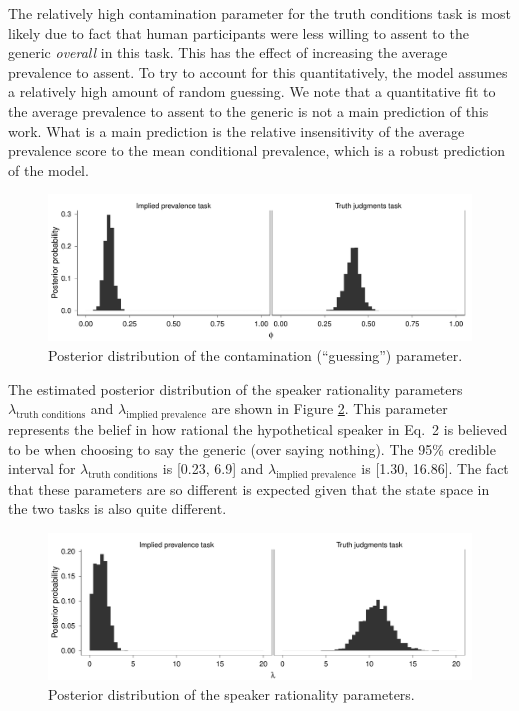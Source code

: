 \documentclass[10pt,letterpaper]{article}
\begin{document}
The relatively high contamination parameter for the truth conditions task is most likely due to fact that human participants were less willing to assent to the generic \emph{overall} in this task. 
This has the effect of increasing the average prevalence to assent. 
To try to account for this quantitatively, the model assumes a relatively high amount of random guessing. 
We note that a quantitative fit to the average prevalence to assent to the generic is not a main prediction of this work. 
What is a main prediction is the relative insensitivity of the average prevalence score to the mean conditional prevalence, which is a robust prediction of the model. 


\begin{figure}
\centering
    \includegraphics[width=0.8\columnwidth]{asymmetry-phi-3x50k.pdf}
    \caption{Posterior distribution of the contamination (``guessing'') parameter.}
  \label{fig:phi2}
\end{figure}

The estimated posterior distribution of the speaker rationality parameters $\lambda_{\text{truth conditions}}$ and $\lambda_{\text{implied prevalence}}$ are shown in Figure \ref{fig:rationality2}. 
This parameter represents the belief in how rational the hypothetical speaker in Eq.~2 is believed to be when choosing to say the generic (over saying nothing). 
The 95\% credible interval for $\lambda_{\text{truth conditions}}$ is [0.23, 6.9] and $\lambda_{\text{implied prevalence}}$ is [1.30, 16.86]. 
The fact that these parameters are so different is expected given that the state space in the two tasks is also quite different.


\begin{figure}
\centering
    \includegraphics[width=0.8\columnwidth]{asymmetry-speakeropts-3x50k.pdf}
    \caption{Posterior distribution of the speaker rationality parameters.}
  \label{fig:rationality2}
\end{figure}
\end{document}
